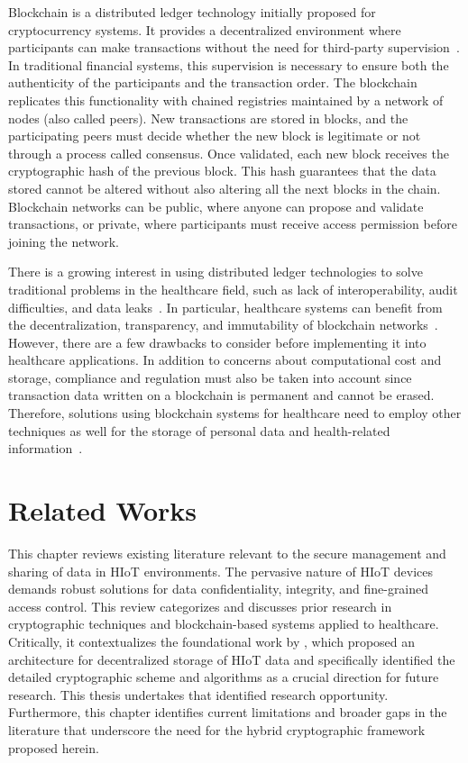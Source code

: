 \documentclass[cic,tc,english]{iiufrgs}
\numberwithin{algorithm}{chapter}
\begin{document}
        Blockchain is a distributed ledger technology initially proposed for cryptocurrency systems. It provides a decentralized environment where participants can make transactions without the need for third-party supervision~\cite{abou2019blockchain}. In traditional financial systems, this supervision is necessary to ensure both the authenticity of the participants and the transaction order. The blockchain replicates this functionality with chained registries maintained by a network of nodes (also called peers). New transactions are stored in blocks, and the participating peers must decide whether the new block is legitimate or not through a process called consensus. Once validated, each new block receives the cryptographic hash of the previous block. This hash guarantees that the data stored cannot be altered without also altering all the next blocks in the chain. Blockchain networks can be public, where anyone can propose and validate transactions, or private, where participants must receive access permission before joining the network. 
        
        There is a growing interest in using distributed ledger technologies to solve traditional problems in the healthcare field, such as lack of interoperability, audit difficulties, and data leaks~\cite{santos2021towards}. In particular, healthcare systems can benefit from the decentralization, transparency, and immutability of blockchain networks~\cite{Arbabi2023}. However, there are a few drawbacks to consider before implementing it into healthcare applications. In addition to concerns about computational cost and storage, compliance and regulation must also be taken into account since transaction data written on a blockchain is permanent and cannot be erased. Therefore, solutions using blockchain systems for healthcare need to employ other techniques as well for the storage of personal data and health-related information~\cite{minicurso-sbcas}.


\chapter{Related Works}
    \label{chap:relatedworks}

    This chapter reviews existing literature relevant to the secure management and sharing of data in HIoT environments. The pervasive nature of HIoT devices demands robust solutions for data confidentiality, integrity, and fine-grained access control. This review categorizes and discusses prior research in cryptographic techniques and blockchain-based systems applied to healthcare. Critically, it contextualizes the foundational work by \citet{laura2023}, which proposed an architecture for decentralized storage of HIoT data and specifically identified the detailed cryptographic scheme and algorithms as a crucial direction for future research. This thesis undertakes that identified research opportunity. Furthermore, this chapter identifies current limitations and broader gaps in the literature that underscore the need for the hybrid cryptographic framework proposed herein.
\end{document}
